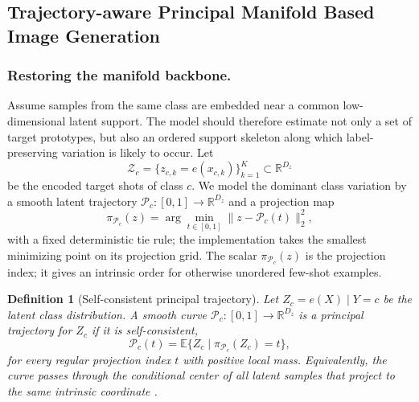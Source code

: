 \documentclass{article}
\newtheorem{definition}{Definition}
\begin{document}
\subsection{Trajectory-aware Principal Manifold Based Image Generation}
\subsubsection{Restoring the manifold backbone.} Assume samples from the same class are embedded near a common low-dimensional latent support. The model should therefore estimate not only a set of target prototypes, but also an ordered support skeleton along which label-preserving variation is likely to occur. Let
\[
	\mathcal{Z}_c=\{z_{c,k}=e(x_{c,k})\}_{k=1}^{K}\subset\mathbb{R}^{D_z}
\]
be the encoded target shots of class $c$. We model the dominant class variation by a smooth latent trajectory $\mathcal{P}_c:[0,1]\rightarrow\mathbb{R}^{D_z}$ and a projection map
\[
	\pi_{\mathcal{P}_c}(z)
	=
	\arg\min_{t\in[0,1]}\lVert z-\mathcal{P}_c(t)\rVert_2^2,
\]
	with a fixed deterministic tie rule; the implementation takes the smallest minimizing point on its projection grid. The scalar $\pi_{\mathcal{P}_c}(z)$ is the projection index; it gives an intrinsic order for otherwise unordered few-shot examples.

\begin{definition}[Self-consistent principal trajectory]
	Let $Z_c=e(X)\mid Y=c$ be the latent class distribution. A smooth curve $\mathcal{P}_c:[0,1]\rightarrow\mathbb{R}^{D_z}$ is a principal trajectory for $Z_c$ if it is self-consistent,
	\[
		\mathcal{P}_c(t)
		=
		\mathbb{E}\{Z_c\mid \pi_{\mathcal{P}_c}(Z_c)=t\},
	\]
	for every regular projection index $t$ with positive local mass. Equivalently, the curve passes through the conditional center of all latent samples that project to the same intrinsic coordinate \citep{hastie1989principal, tibshirani1992}.
\end{definition}
\end{document}
